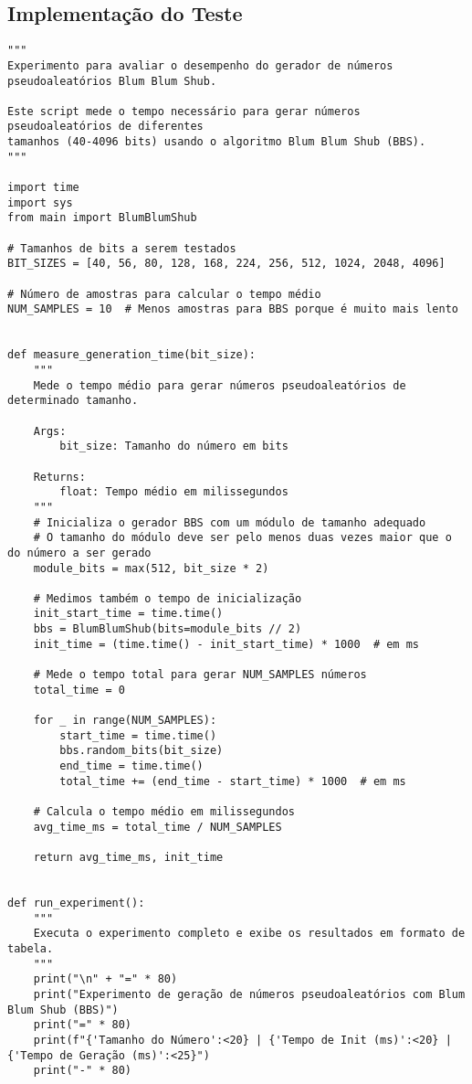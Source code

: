 \subsection{Implementação do Teste}

\begin{verbatim}
"""
Experimento para avaliar o desempenho do gerador de números pseudoaleatórios Blum Blum Shub.

Este script mede o tempo necessário para gerar números pseudoaleatórios de diferentes
tamanhos (40-4096 bits) usando o algoritmo Blum Blum Shub (BBS).
"""

import time
import sys
from main import BlumBlumShub

# Tamanhos de bits a serem testados
BIT_SIZES = [40, 56, 80, 128, 168, 224, 256, 512, 1024, 2048, 4096]

# Número de amostras para calcular o tempo médio
NUM_SAMPLES = 10  # Menos amostras para BBS porque é muito mais lento


def measure_generation_time(bit_size):
    """
    Mede o tempo médio para gerar números pseudoaleatórios de determinado tamanho.
    
    Args:
        bit_size: Tamanho do número em bits
    
    Returns:
        float: Tempo médio em milissegundos
    """
    # Inicializa o gerador BBS com um módulo de tamanho adequado
    # O tamanho do módulo deve ser pelo menos duas vezes maior que o do número a ser gerado
    module_bits = max(512, bit_size * 2)
    
    # Medimos também o tempo de inicialização
    init_start_time = time.time()
    bbs = BlumBlumShub(bits=module_bits // 2)
    init_time = (time.time() - init_start_time) * 1000  # em ms
    
    # Mede o tempo total para gerar NUM_SAMPLES números
    total_time = 0
    
    for _ in range(NUM_SAMPLES):
        start_time = time.time()
        bbs.random_bits(bit_size)
        end_time = time.time()
        total_time += (end_time - start_time) * 1000  # em ms
    
    # Calcula o tempo médio em milissegundos
    avg_time_ms = total_time / NUM_SAMPLES
    
    return avg_time_ms, init_time


def run_experiment():
    """
    Executa o experimento completo e exibe os resultados em formato de tabela.
    """
    print("\n" + "=" * 80)
    print("Experimento de geração de números pseudoaleatórios com Blum Blum Shub (BBS)")
    print("=" * 80)
    print(f"{'Tamanho do Número':<20} | {'Tempo de Init (ms)':<20} | {'Tempo de Geração (ms)':<25}")
    print("-" * 80)
    

\end{verbatim}
